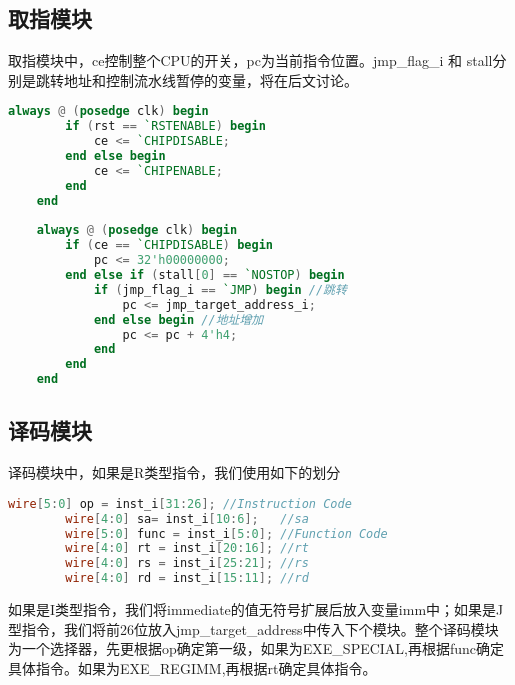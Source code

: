     \subsection{取指模块} \label{sec:qzmk}
    取指模块中，ce控制整个CPU的开关，pc为当前指令位置。jmp\_flag\_i 和 stall分别是跳转地址和控制流水线暂停的变量，将在后文讨论。
    \begin{lstlisting}[language=Verilog]
    always @ (posedge clk) begin
		if (rst == `RSTENABLE) begin
			ce <= `CHIPDISABLE;
		end else begin
			ce <= `CHIPENABLE;
		end
	end
		
	always @ (posedge clk) begin
		if (ce == `CHIPDISABLE) begin
			pc <= 32'h00000000;
		end else if (stall[0] == `NOSTOP) begin
			if (jmp_flag_i == `JMP) begin //跳转
				pc <= jmp_target_address_i;
			end else begin //地址增加
				pc <= pc + 4'h4;
			end
		end
    end
    \end{lstlisting}

    \subsection{译码模块} \label{sec:ymmk}
    译码模块中，如果是R类型指令，我们使用如下的划分
    \begin{lstlisting}[language=Verilog]
        wire[5:0] op = inst_i[31:26]; //Instruction Code
        wire[4:0] sa= inst_i[10:6];   //sa
        wire[5:0] func = inst_i[5:0]; //Function Code
        wire[4:0] rt = inst_i[20:16]; //rt
        wire[4:0] rs = inst_i[25:21]; //rs
        wire[4:0] rd = inst_i[15:11]; //rd
    \end{lstlisting}
    如果是I类型指令，我们将immediate的值无符号扩展后放入变量imm中；如果是J型指令，我们将前26位放入jmp\_target\_address中传入下个模块。整个译码模块为一个选择器，先更根据op确定第一级，如果为EXE\_SPECIAL,再根据func确定具体指令。如果为EXE\_REGIMM,再根据rt确定具体指令。
    
